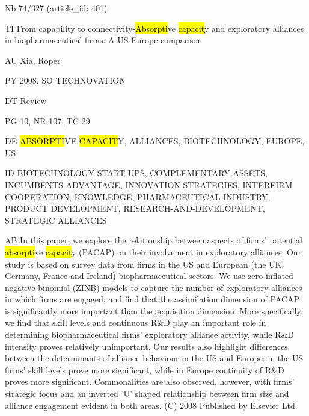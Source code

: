\documentclass[a4paper]{article}
\begin{document}
\vspace*{-2cm}
Nb \tabto{0cm}74/327 (article\_id: 401)\par
TI \tabto{0cm}From capability to connectivity-\hl{Absorpti}ve \hl{capacit}y and exploratory alliances in biopharmaceutical firms: A US-Europe comparison\par
AU \tabto{0cm}Xia, Roper\par
PY \tabto{0cm}2008, SO TECHNOVATION\par
DT \tabto{0cm}Review\par
PG \tabto{0cm}10, NR 107, TC 29\par
DE \tabto{0cm}\hl{ABSORPTI}VE \hl{CAPACIT}Y, ALLIANCES, BIOTECHNOLOGY, EUROPE, US\par
ID \tabto{0cm}BIOTECHNOLOGY START-UPS, COMPLEMENTARY ASSETS, INCUMBENTS ADVANTAGE, INNOVATION STRATEGIES, INTERFIRM COOPERATION, KNOWLEDGE, PHARMACEUTICAL-INDUSTRY, PRODUCT DEVELOPMENT, RESEARCH-AND-DEVELOPMENT, STRATEGIC ALLIANCES\par
AB \tabto{0cm}In this paper, we explore the relationship between aspects of firms' potential \hl{absorpti}ve \hl{capacit}y (PACAP) on their involvement in exploratory alliances. Our study is based on survey data from firms in the US and European (the UK, Germany, France and Ireland) biopharmaceutical sectors. We use zero inflated negative binomial (ZINB) models to capture the number of exploratory alliances in which firms are engaged, and find that the assimilation dimension of PACAP is significantly more important than the acquisition dimension. More specifically, we find that skill levels and continuous R\&D play an important role in determining biopharmaceutical firms' exploratory alliance activity, while R\&D intensity proves relatively unimportant. Our results also highlight differences between the determinants of alliance behaviour in the US and Europe: in the US firms' skill levels prove more significant, while in Europe continuity of R\&D proves more significant. Commonalities are also observed, however, with firms' strategic focus and an inverted 'U' shaped relationship between firm size and alliance engagement evident in both areas. (C) 2008 Published by Elsevier Ltd.\par
\clearpage
\end{document}
